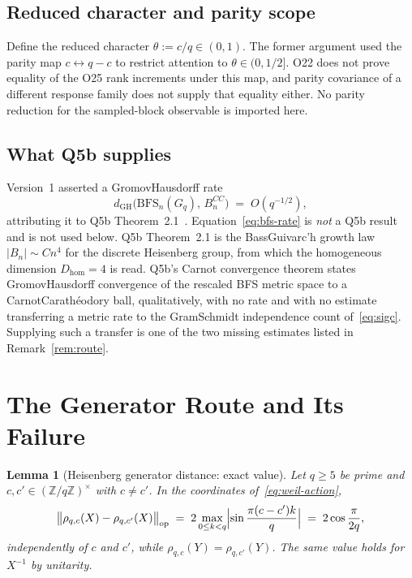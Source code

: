 \documentclass[12pt,a4paper]{article}
\newtheorem{lemma}[theorem]{Lemma}
\theoremstyle{definition}
\theoremstyle{remark}
\begin{document}
    \subsection{Reduced character and parity scope}

      Define the reduced character $\theta := c/q \in (0,1)$.
      The former argument used the parity map $c\leftrightarrow q-c$ to restrict attention
      to $\theta\in(0,1/2]$.
      O22 does not prove equality of the O25 rank increments under this map, and parity
      covariance of a different response family does not supply that equality either.
      No parity reduction for the sampled-block observable is imported here.

    \subsection{What Q5b supplies}

      Version~1 asserted a Gromov\textendash Hausdorff rate
      \begin{equation}\label{eq:bfs-rate}
        d_{\mathrm{GH}}\!\bigl(\mathrm{BFS}_n(G_q),\, B_n^{CC}\bigr) \;=\; O(q^{-1/2}),
      \end{equation}
      attributing it to Q5b Theorem~2.1~\cite{Beau2026q5b}.
      Equation~\eqref{eq:bfs-rate} is \emph{not} a Q5b result and is not used below.
      Q5b Theorem~2.1 is the Bass\textendash Guivarc'h growth law $|B_n| \sim Cn^4$ for the
      discrete Heisenberg group, from which the homogeneous dimension $D_{\mathrm{hom}} = 4$ is read.
      Q5b's Carnot convergence theorem states Gromov\textendash Hausdorff convergence of the
      rescaled BFS metric space to a Carnot\textendash Carath\'eodory ball, qualitatively,
      with no rate and with no estimate transferring a metric rate to the
      Gram\textendash Schmidt independence count of~\eqref{eq:sigc}.
      Supplying such a transfer is one of the two missing estimates listed in
      Remark~\ref{rem:route}.

  \section{The Generator Route and Its Failure}\label{sec:lipschitz}

    \begin{lemma}[Heisenberg generator distance: exact value]\label{lem:generator-perturb}
      Let $q \geq 5$ be prime and $c, c' \in (\mathbb{Z}/q\mathbb{Z})^\times$ with
      $c \neq c'$. In the coordinates of~\eqref{eq:weil-action},
      \begin{equation}\label{eq:gen-perturb}
        \bigl\|\rho_{q,c}(X) - \rho_{q,c'}(X)\bigr\|_{\mathrm{op}}
        \;=\; 2\max_{0 \leq k < q}\Bigl|\sin\frac{\pi(c-c')k}{q}\Bigr|
        \;=\; 2\cos\frac{\pi}{2q},
      \end{equation}
      independently of $c$ and $c'$, while $\rho_{q,c}(Y) = \rho_{q,c'}(Y)$.
      The same value holds for $X^{-1}$ by unitarity.
    \end{lemma}
\end{document}
